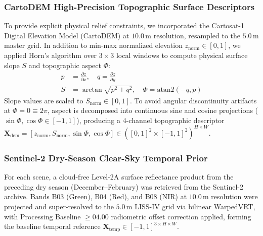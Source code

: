 \subsubsection{CartoDEM High-Precision Topographic Surface Descriptors}
To provide explicit physical relief constraints, we incorporated the Cartosat-1 Digital Elevation Model (CartoDEM) at $10.0\,\text{m}$ resolution, resampled to the $5.0\,\text{m}$ master grid. In addition to min-max normalized elevation $z_{\text{norm}} \in [0, 1]$, we applied Horn's algorithm \cite{horn1981hill} over $3\times 3$ local windows to compute physical surface slope $S$ and topographic aspect $\Phi$:
\begin{align}
    p &= \frac{\partial z}{\partial x}, \quad q = \frac{\partial z}{\partial y} \\
    S &= \arctan\sqrt{p^2 + q^2}, \quad \Phi = \text{atan2}(-q, p)
\end{align}
Slope values are scaled to $S_{\text{norm}} \in [0, 1]$. To avoid angular discontinuity artifacts at $\Phi = 0 \equiv 2\pi$, aspect is decomposed into continuous sine and cosine projections ($\sin\Phi, \cos\Phi \in [-1, 1]$), producing a 4-channel topographic descriptor $\mathbf{X}_{\text{dem}} = [z_{\text{norm}}, S_{\text{norm}}, \sin\Phi, \cos\Phi] \in ([0, 1]^2 \times [-1, 1]^2)^{H \times W}$.

\subsubsection{Sentinel-2 Dry-Season Clear-Sky Temporal Prior}
For each scene, a cloud-free Level-2A surface reflectance product from the preceding dry season (December--February) was retrieved from the Sentinel-2 archive. Bands B03 (Green), B04 (Red), and B08 (NIR) at $10.0\,\text{m}$ resolution were projected and super-resolved to the $5.0\,\text{m}$ LISS-IV grid via bilinear WarpedVRT, with Processing Baseline $\ge 04.00$ radiometric offset correction applied, forming the baseline temporal reference $\mathbf{X}_{\text{temp}} \in [-1, 1]^{3 \times H \times W}$.


